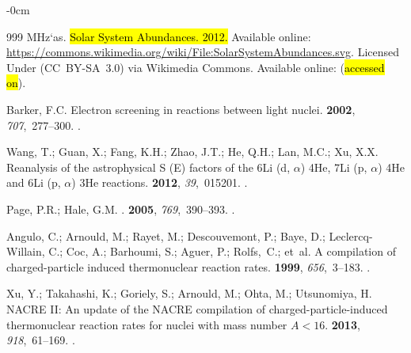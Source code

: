 \documentclass[particles,article,accept,pdftex,moreauthors]{Definitions/mdpi}
\begin{document}
\begin{adjustwidth}{-\extralength}{0cm}
\begin{thebibliography}{999}
{MHz`as}.
\newblock \hl{Solar System Abundances. 2012.} %
\newblock
 Available online: \url{https://commons.wikimedia.org/wiki/File:SolarSystemAbundances.svg}.
\newblock Licensed Under (CC~BY-SA~3.0) via  Wikimedia Commons.
Available online:   %
 (\hl{accessed on}).

Barker, F.C.
\newblock Electron screening in reactions between light nuclei.
 {\bf 2002}, {\em 707},~277--300.
.

Wang, T.; Guan, X.;  Fang, K.H.; Zhao, J.T.; He, Q.H.; Lan, M.C.; Xu, X.X.
\newblock Reanalysis of the astrophysical S (E) factors of the 6Li (d,
  $\alpha$) 4He, 7Li (p, $\alpha$) 4He and 6Li (p, $\alpha$) 3He reactions.
 {\bf 2012}, {\em 39},~015201.
.

Page, P.R.; Hale, G.M.
.
 {\bf 2005}, {\em 769},~390--393.
.

Angulo, C.; Arnould, M.;  Rayet, M.; Descouvemont, P.; Baye, D.; Leclercq-Willain, C.; Coc, A.; Barhoumi, S.; Aguer, P.; Rolfs,~C.; et~al.
\newblock A compilation of charged-particle induced thermonuclear reaction
  rates.
 {\bf 1999}, {\em 656},~3--183.
.

Xu, Y.; Takahashi, K.;  Goriely, S.; Arnould, M.; Ohta, M.; Utsunomiya, H.
\newblock NACRE II: An update of the NACRE compilation of
  charged-particle-induced thermonuclear reaction rates for nuclei with mass
  number $A < 16$.
 {\bf 2013}, {\em 918},~61--169.
.


\end{thebibliography}
\end{adjustwidth}
\end{document}
